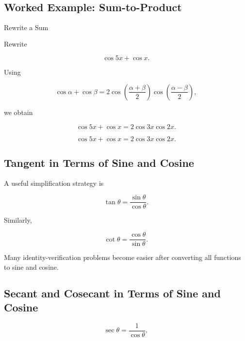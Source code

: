 \subsection{Worked Example: Sum-to-Product}
\label{subsec:worked-sum-to-product}

\begin{workedexamplebox}{Rewrite a Sum}

Rewrite

\[
\cos5x+\cos x.
\]

Using

\[
\cos\alpha+\cos\beta
=
2
\cos
\left(
\frac{\alpha+\beta}{2}
\right)
\cos
\left(
\frac{\alpha-\beta}{2}
\right),
\]

we obtain

\[
\cos5x+\cos x
=
2\cos3x\cos2x.
\]

\begin{answerbox}
\[
\boxed{
\cos5x+\cos x
=
2\cos3x\cos2x.
}
\]
\end{answerbox}

\end{workedexamplebox}

\subsection{Tangent in Terms of Sine and Cosine}
\label{subsec:tangent-sine-cos-reference}

A useful simplification strategy is

\[
\boxed{
\tan\theta
=
\frac{\sin\theta}{\cos\theta}.
}
\]

Similarly,

\[
\boxed{
\cot\theta
=
\frac{\cos\theta}{\sin\theta}.
}
\]

Many identity-verification problems become easier after converting all
functions to sine and cosine.

\subsection{Secant and Cosecant in Terms of Sine and Cosine}
\label{subsec:sec-csc-sine-cos}

\[
\boxed{
\sec\theta
=
\frac{1}{\cos\theta},
}
\]

